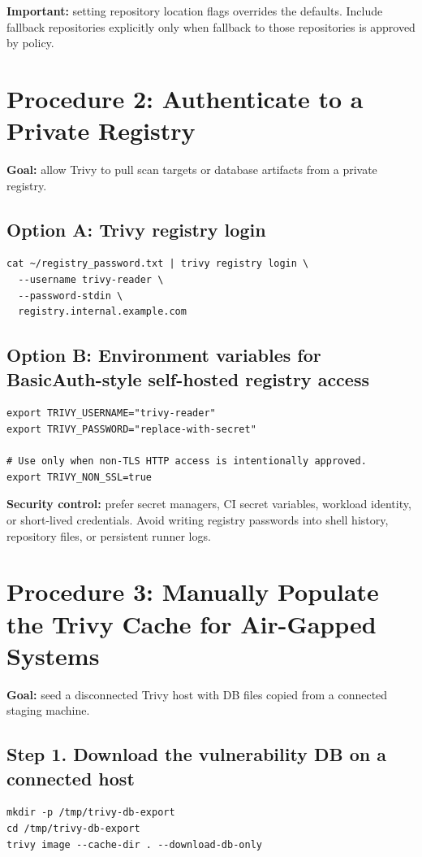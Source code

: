 \documentclass[10pt]{article}
\begin{document}
\textbf{Important:} setting repository location flags overrides the defaults. Include fallback repositories explicitly only when fallback to those repositories is approved by policy.

\section{Procedure 2: Authenticate to a Private Registry}
\textbf{Goal:} allow Trivy to pull scan targets or database artifacts from a private registry.

\subsection{Option A: Trivy registry login}
\begin{lstlisting}[style=shell]
cat ~/registry_password.txt | trivy registry login \
  --username trivy-reader \
  --password-stdin \
  registry.internal.example.com
\end{lstlisting}

\subsection{Option B: Environment variables for BasicAuth-style self-hosted registry access}
\begin{lstlisting}[style=shell]
export TRIVY_USERNAME="trivy-reader"
export TRIVY_PASSWORD="replace-with-secret"

# Use only when non-TLS HTTP access is intentionally approved.
export TRIVY_NON_SSL=true
\end{lstlisting}

\textbf{Security control:} prefer secret managers, CI secret variables, workload identity, or short-lived credentials. Avoid writing registry passwords into shell history, repository files, or persistent runner logs.

\section{Procedure 3: Manually Populate the Trivy Cache for Air-Gapped Systems}
\textbf{Goal:} seed a disconnected Trivy host with DB files copied from a connected staging machine.

\subsection{Step 1. Download the vulnerability DB on a connected host}
\begin{lstlisting}[style=shell]
mkdir -p /tmp/trivy-db-export
cd /tmp/trivy-db-export
trivy image --cache-dir . --download-db-only
\end{lstlisting}
\end{document}
